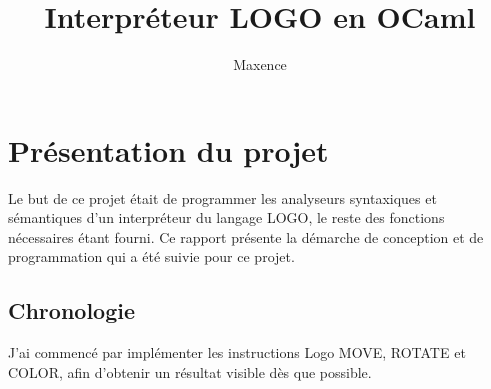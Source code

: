 \documentclass[a4paper]{article}
\title{Interpréteur LOGO en OCaml}           %
\author{Maxence \bsc{Ahlouche}}
\date{}                       %
\begin{document}
\maketitle                    %


\tableofcontents

\section{Présentation du projet}

Le but de ce projet était de programmer les analyseurs syntaxiques et
sémantiques d'un interpréteur du langage LOGO, le reste des fonctions
nécessaires étant fourni. Ce rapport présente la démarche de conception et de
programmation qui a été suivie pour ce projet.

\subsection{Chronologie}
J'ai commencé par implémenter les instructions Logo MOVE, ROTATE et COLOR, afin
d'obtenir un résultat visible dès que possible.











\end{document}
